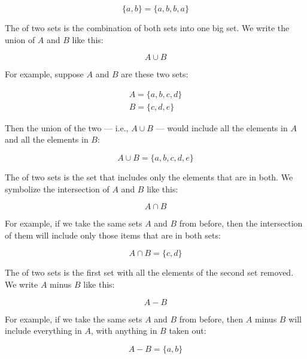 \documentclass[../../../main.tex]{subfiles}
\begin{document}
\begin{equation*}
\{ a, b \} = \{ a, b, b, a \}
\end{equation*}

\noindent
The  of two sets is the combination of both sets into one big set. We write the union of $A$ and $B$ like this:

\begin{equation*}
A \cup B
\end{equation*}

\noindent
For example, suppose $A$ and $B$ are these two sets:

\begin{align*}
  A = \{ a, b, c, d \} \\
  B = \{ c, d, e \}
\end{align*}

\noindent
Then the union of the two --- i.e., $A \cup B$ --- would include all the elements in $A$ and all the elements in $B$:

\begin{equation*}
  A \cup B = \{ a, b, c, d, e \}
\end{equation*}

\noindent
The  of two sets is the set that includes only the elements that are in both. We symbolize the intersection of $A$ and $B$ like this:

\begin{equation*}
A \cap B
\end{equation*}

\noindent
For example, if we take the same sets $A$ and $B$ from before, then the intersection of them will include only those items that are in both sets:

\begin{equation*}
  A \cap B = \{ c, d \}
\end{equation*}

\noindent
The  of two sets is the first set with all the elements of the second set removed. We write $A$ minus $B$ like this:

\begin{equation*}
A - B
\end{equation*}

\noindent
For example, if we take the same sets $A$ and $B$ from before, then $A$ minus $B$ will include everything in $A$, with anything in $B$ taken out:

\begin{equation*}
  A - B = \{ a, b \}
\end{equation*}
\end{document}
